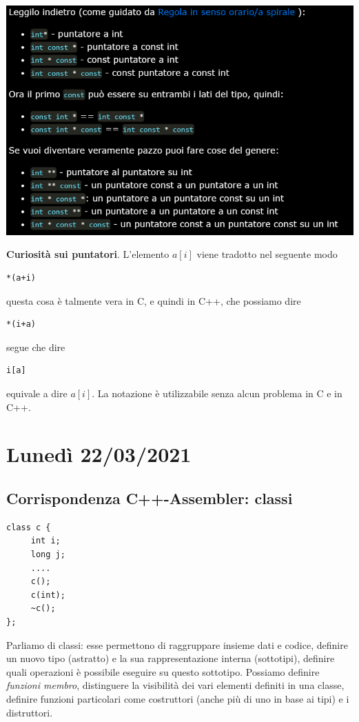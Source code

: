 \documentclass[11pt]{report}
\theoremstyle{definition}
\begin{document}
\begin{center}
	\includegraphics[scale=0.80]{img/155.PNG}
\end{center} 

\begin{framed}\noindent \textbf{Curiosità sui puntatori}. L'elemento $a[i]$ viene tradotto nel seguente modo
\begin{verbatim}
*(a+i)
\end{verbatim}
questa cosa è talmente vera in C, e quindi in C++, che possiamo dire
\begin{verbatim}
*(i+a)
\end{verbatim}
segue che dire
\begin{verbatim}
i[a]
\end{verbatim}
equivale a dire $a[i]$. La notazione è utilizzabile senza alcun problema in C e in C++.\end{framed}

\chapter{Lunedì 22/03/2021}
\section{Corrispondenza C++-Assembler: classi}
\begin{verbatim}
class c {
     int i;
     long j;
     ....
     c();
     c(int);
     ~c();
};
\end{verbatim}
Parliamo di classi: esse permettono di raggruppare insieme dati e codice, definire un nuovo tipo (astratto) e la sua rappresentazione interna (sottotipi), definire quali operazioni è possibile eseguire su questo sottotipo.
Possiamo definire \emph{funzioni membro}, distinguere la visibilità dei vari elementi definiti in una classe, definire funzioni particolari come costruttori (anche più di uno in base ai tipi) e i distruttori.
\end{document}
